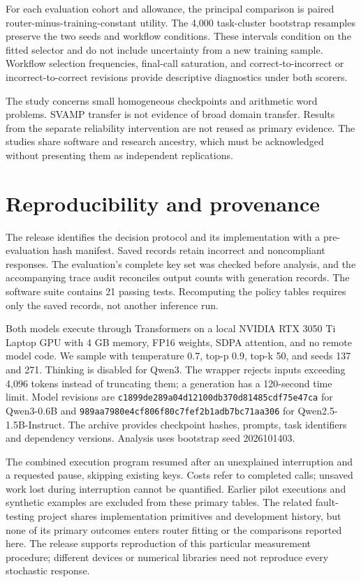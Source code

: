 \documentclass[10pt]{article}
\begin{document}
For each evaluation cohort and allowance, the principal comparison is paired router-minus-training-constant utility. The 4,000 task-cluster bootstrap resamples preserve the two seeds and workflow conditions. These intervals condition on the fitted selector and do not include uncertainty from a new training sample. Workflow selection frequencies, final-call saturation, and correct-to-incorrect or incorrect-to-correct revisions provide descriptive diagnostics under both scorers.

The study concerns small homogeneous checkpoints and arithmetic word problems. SVAMP transfer is not evidence of broad domain transfer. Results from the separate reliability intervention are not reused as primary evidence. The studies share software and research ancestry, which must be acknowledged without presenting them as independent replications.
\section{Reproducibility and provenance}
The release identifies the decision protocol and its implementation with a pre-evaluation hash manifest. Saved records retain incorrect and noncompliant responses. The evaluation's complete key set was checked before analysis, and the accompanying trace audit reconciles output counts with generation records. The software suite contains 21 passing tests. Recomputing the policy tables requires only the saved records, not another inference run.

Both models execute through Transformers on a local NVIDIA RTX 3050 Ti Laptop GPU with 4 GB memory, FP16 weights, SDPA attention, and no remote model code. We sample with temperature 0.7, top-p 0.9, top-k 50, and seeds 137 and 271. Thinking is disabled for Qwen3. The wrapper rejects inputs exceeding 4,096 tokens instead of truncating them; a generation has a 120-second time limit. Model revisions are \texttt{c1899de289a04d12100db370d81485cdf75e47ca} for Qwen3-0.6B and \texttt{989aa7980e4cf806f80c7fef2b1adb7bc71aa306} for Qwen2.5-1.5B-Instruct. The archive provides checkpoint hashes, prompts, task identifiers and dependency versions. Analysis uses bootstrap seed 2026101403.

The combined execution program resumed after an unexplained interruption and a requested pause, skipping existing keys. Costs refer to completed calls; unsaved work lost during interruption cannot be quantified. Earlier pilot executions and synthetic examples are excluded from these primary tables. The related fault-testing project shares implementation primitives and development history, but none of its primary outcomes enters router fitting or the comparisons reported here. The release supports reproduction of this particular measurement procedure; different devices or numerical libraries need not reproduce every stochastic response.
\end{document}
